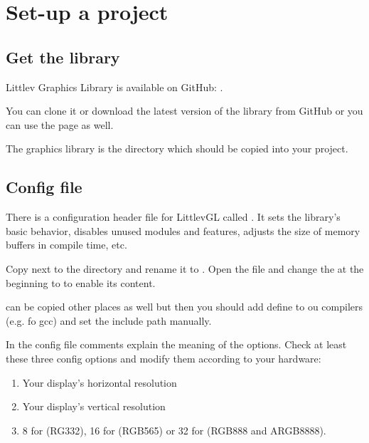 \documentclass[letterpaper,10pt,english]{sphinxmanual}
\begin{document}
\section{Set-up a project}
\label{\detokenize{porting/project:set-up-a-project}}\label{\detokenize{porting/project::doc}}

\subsection{Get the library}
\label{\detokenize{porting/project:get-the-library}}
Littlev Graphics Library is available on GitHub: .

You can clone it or download the latest version of the library from GitHub or you can use the  page as well.

The graphics library is the  directory which should be copied into your project.


\subsection{Config file}
\label{\detokenize{porting/project:config-file}}
There is a configuration header file for LittlevGL called . It sets the library’s basic behavior, disables unused modules and features, adjusts the size of memory buffers in compile time, etc.

Copy  next to the  directory and rename it to . Open the file and change the  at the beginning to  to enable its content.

 can be copied other places as well but then you should add  define to ou compilers (e.g.  fo gcc) and set the include path manually.

In the config file comments explain the meaning of the options. Check at least these three config options and modify them according to your hardware:
\begin{enumerate}
\def\theenumi{\arabic{enumi}}
\def\labelenumi{\theenumi .}
\makeatletter\def\p@enumii{\p@enumi \theenumi .}\makeatother
\item {} 
 Your display’s horizontal resolution

\item {} 
 Your display’s vertical resolution

\item {} 
 8 for (RG332), 16 for (RGB565) or 32 for (RGB888 and ARGB8888).

\end{enumerate}
\end{document}
